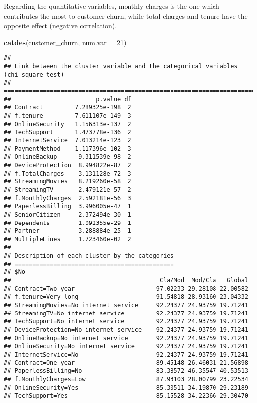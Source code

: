 \documentclass[
  a4paper]{article}
\newenvironment{Shaded}{\begin{snugshade}}{\end{snugshade}}
\newcommand{\AttributeTok}[1]{\textcolor[rgb]{0.13,0.29,0.53}{#1}}
\newcommand{\DecValTok}[1]{\textcolor[rgb]{0.00,0.00,0.81}{#1}}
\newcommand{\FunctionTok}[1]{\textcolor[rgb]{0.13,0.29,0.53}{\textbf{#1}}}
\newcommand{\NormalTok}[1]{#1}
\begin{document}
Regarding the quantitative variables, monthly charges is the one which
contributes the most to customer churn, while total charges and tenure
have the opposite effect (negative correlation).

\begin{Shaded}
\begin{Highlighting}[]
\FunctionTok{catdes}\NormalTok{(customer\_churn, }\AttributeTok{num.var =} \DecValTok{21}\NormalTok{)}
\end{Highlighting}
\end{Shaded}

\begin{verbatim}
## 
## Link between the cluster variable and the categorical variables (chi-square test)
## =================================================================================
##                        p.value df
## Contract         7.289325e-198  2
## f.tenure         7.611107e-149  3
## OnlineSecurity   1.156313e-137  2
## TechSupport      1.473778e-136  2
## InternetService  7.013214e-123  2
## PaymentMethod    1.117396e-102  3
## OnlineBackup      9.311539e-98  2
## DeviceProtection  8.994822e-87  2
## f.TotalCharges    3.131128e-72  3
## StreamingMovies   8.219260e-58  2
## StreamingTV       2.479121e-57  2
## f.MonthlyCharges  2.592181e-56  3
## PaperlessBilling  3.996005e-47  1
## SeniorCitizen     2.372494e-30  1
## Dependents        1.092355e-29  1
## Partner           3.288884e-25  1
## MultipleLines     1.723460e-02  2
## 
## Description of each cluster by the categories
## =============================================
## $No
##                                          Cla/Mod  Mod/Cla   Global
## Contract=Two year                       97.02233 29.28108 22.00582
## f.tenure=Very long                      91.54818 28.93160 23.04332
## StreamingMovies=No internet service     92.24377 24.93759 19.71241
## StreamingTV=No internet service         92.24377 24.93759 19.71241
## TechSupport=No internet service         92.24377 24.93759 19.71241
## DeviceProtection=No internet service    92.24377 24.93759 19.71241
## OnlineBackup=No internet service        92.24377 24.93759 19.71241
## OnlineSecurity=No internet service      92.24377 24.93759 19.71241
## InternetService=No                      92.24377 24.93759 19.71241
## Contract=One year                       89.45148 26.46031 21.56898
## PaperlessBilling=No                     83.38572 46.35547 40.53513
## f.MonthlyCharges=Low                    87.93103 28.00799 23.22534
## OnlineSecurity=Yes                      85.30511 34.19870 29.23189
## TechSupport=Yes                         85.15528 34.22366 29.30470

\end{verbatim}
\end{document}
